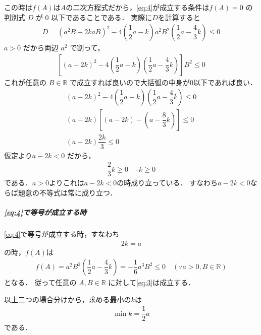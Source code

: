 \documentclass[../../main.tex]{subfiles}
\begin{document}
この時は$f(A)$は$A$の二次方程式だから，\cref{eq:4}が成立する条件は$f(A)=0$ の判別式 $D$ が $0$ 以下であることである．
実際に$D$を計算すると
\begin{align}
  D = (a^2B-2kaB)^2 - 4\left(\dfrac{1}{2}a-k\right)a^2B^2\left(\dfrac{1}{2}a-\dfrac{4}{3}k\right) \le 0
\end{align}
$a>0$ だから両辺 $a^2$ で割って，
\begin{align}
  \left[(a-2k)^2 - 4\left(\dfrac{1}{2}a-k\right)\left(\dfrac{1}{2}a-\dfrac{4}{3}k\right)\right]B^2 \le 0
\end{align}
これが任意の $B\in\mathbb{R}$ で成立すれば良いので大括弧の中身が$0$以下であれば良い．
\begin{align}
  (a-2k)^2-4\left(\dfrac{1}{2}a-k\right)\left(\dfrac{1}{2}a-\dfrac{4}{3}k\right) \le 0 \\
  (a-2k)\left[(a-2k)-\left(a-\dfrac{8}{3}k\right)\right] \le 0 \\
  (a-2k)\dfrac{2k}{3} \le 0
\end{align}
仮定より$a-2k<0$ だから，
\begin{align}
  \dfrac{2}{3}k \ge 0 \quad \therefore k \ge 0
\end{align}
である．$a>0$よりこれは$a-2k<0$の時成り立っている．
すなわち$a-2k<0$ならば題意の不等式は常に成り立つ．

\subparagraph{\cref{eq:4}で等号が成立する時}

\cref{eq:4}で等号が成立する時，すなわち
\begin{align}
  2k = a
\end{align}
の時，$f(A)$は
\begin{align}
  f(A) = a^2B^2\left(\dfrac{1}{2}a-\dfrac{4}{3}k\right) = -\dfrac{1}{6}a^3B^2 \le 0 \quad (\because a>0, B\in\mathbb{R})
\end{align}
となる．
従って任意の $A,B\in\mathbb{R}$ に対して\cref{eq:3}は成立する．
\casesend

以上二つの場合分けから，求める最小の$k$は
\begin{align}
  \min k = \dfrac{1}{2}a
\end{align}
である．

\newpage
\end{document}

